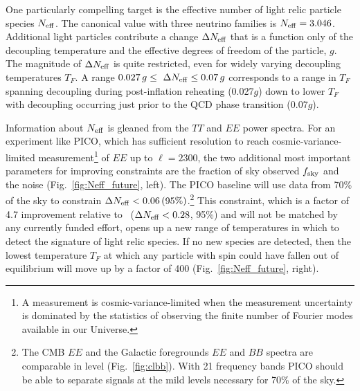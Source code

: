 \documentclass[PICOReport.tex]{subfiles}
\begin{document}
One particularly compelling target is the effective number of light relic particle species ${N_{\rm eff}}$. The canonical value with three neutrino families is ${N_{\rm eff}} = 3.046$. Additional light particles contribute a change $\Delta {N_{\rm eff}}$ that is a function only of the decoupling temperature and the effective degrees of freedom of the particle, $g$. The magnitude of $\Delta{N_{\rm eff}}$ is quite restricted, even for widely varying decoupling temperatures $T_{F}$. A range $ 0.027\,g \leq \ \Delta {N_{\rm eff}} \leq 0.07\,g$ corresponds to a range in $T_{F}$ spanning decoupling during post-inflation reheating (0.027$g$) down to lower $T_{F}$ with decoupling occurring just prior to the QCD phase transition ($0.07g$).

Information about ${N_{\rm eff}}$ is gleaned from the $TT$ and $EE$ power spectra. For an experiment like PICO, which has sufficient resolution to reach cosmic-variance-limited measurement\footnote{A measurement is cosmic-variance-limited when the measurement uncertainty is dominated by the statistics of observing the finite number of Fourier modes available in our Universe.} of $EE$ up to $\ell =2300$, the two additional most important parameters for improving constraints are the fraction of sky observed $f_{\rm sky}$ and the noise (Fig.~\ref{fig:Neff_future}, left). The PICO baseline will use data from 70\% of the sky to constrain $\Delta {N_{\rm eff}} < 0.06 \, (95\%)$.\footnote{The CMB $EE$ and the Galactic foregrounds $EE$ and $BB$ spectra are comparable in level (Fig.~\ref{fig:clbb}). With 21 frequency bands PICO should be able to separate signals at the mild levels necessary for 70\% of the sky.} This constraint, which is a factor of 4.7 improvement relative to \planck~($\Delta {N_{\rm eff}} < 0.28$, 95\%) and will not be matched by any currently funded effort, opens up a new range of temperatures in which to detect the signature of light relic species. If no new species are detected, then the lowest temperature $T_{F}$ at which any particle with spin could have fallen out of equilibrium will move up by a factor of 400 (Fig.~\ref{fig:Neff_future}, right). 
\end{document}
